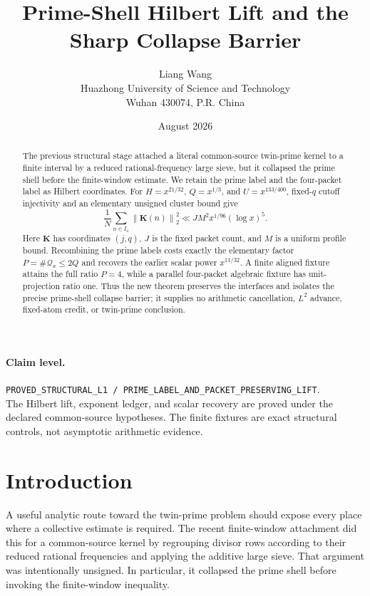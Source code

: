 \documentclass[11pt]{article}
\title{\textbf{Prime-Shell Hilbert Lift and the Sharp Collapse Barrier}}
\author{Liang Wang\\
Huazhong University of Science and Technology\\
Wuhan 430074, P.R. China}
\date{August 2026}
\theoremstyle{remark}
\newcommand{\Qx}{\mathcal Q_x}
\newcommand{\Kvec}{\mathbf K}
\newcommand{\norm}[1]{\left\lVert #1\right\rVert}
\begin{document}
\maketitle

\begin{abstract}
The previous structural stage attached a literal common-source twin-prime
kernel to a finite interval by a reduced rational-frequency large sieve, but
it collapsed the prime shell before the finite-window estimate.  We retain the
prime label and the four-packet label as Hilbert coordinates.  For
$H=x^{21/32}$, $Q=x^{1/3}$, and $U=x^{133/400}$, fixed-$q$ cutoff injectivity
and an elementary unsigned cluster bound give
\[
 \frac{1}{N}\sum_{n\in I_x}\norm{\Kvec(n)}_2^2
 \ll J M^2 x^{1/96}(\log x)^5.
\]
Here $\Kvec$ has coordinates $(j,q)$, $J$ is the fixed packet count, and
$M$ is a uniform profile bound.  Recombining the prime labels costs exactly
the elementary factor $P=\#\Qx\leq 2Q$ and recovers the earlier scalar power
$x^{11/32}$.  A finite aligned fixture attains the full ratio $P=4$, while a
parallel four-packet algebraic fixture has unit-projection ratio one.  Thus
the new theorem preserves the interfaces and isolates the precise prime-shell
collapse barrier; it supplies no arithmetic cancellation, $L^2$ advance,
fixed-atom credit, or twin-prime conclusion.
\end{abstract}

\paragraph{Claim level.}
\texttt{PROVED\_STRUCTURAL\_L1 / PRIME\_LABEL\_AND\_PACKET\_PRESERVING\_LIFT}.\\
The Hilbert lift, exponent ledger, and scalar recovery are proved under the
declared common-source hypotheses.  The finite fixtures are exact structural
controls, not asymptotic arithmetic evidence.

\section{Introduction}

A useful analytic route toward the twin-prime problem should expose every
place where a collective estimate is required.  The recent finite-window
attachment did this for a common-source kernel by regrouping divisor rows
according to their reduced rational frequencies and applying the additive
large sieve.  That argument was intentionally unsigned.  In particular, it
collapsed the prime shell before invoking the finite-window inequality.
\end{document}
